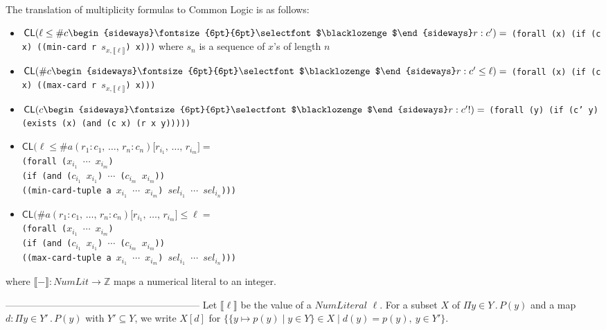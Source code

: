 \documentclass[10pt,fleqn,%
\ifpretendfinal
final%
\else
draft%
\fi,
]{scrreprt}
\newcommand*{\CL}{\ensuremath{\mathsf{CL}}\xspace}
\newcommand{\composition}{\raisebox{0.2pt}{\begin{sideways}\fontsize{6pt}{6pt}\selectfont$\blacklozenge$\end{sideways}}}
\newcommand{\ZZ}{\mathbb{Z}}
\newcommand{\sem}[1]{\mathopen\llbracket#1\mathclose\rrbracket}
\begin{document}
The translation of multiplicity formulas to Common Logic is as follows:
\begin{itemize}
  \item $\CL(\ell \leq \mathsf{\#}c\composition r \mathrel{\mathsf{:}} c')=$
\texttt{(forall (x) (if (c x) ((min-card r $s_{x,\sem{\ell}}$) x)))}
where  $s_n$ is a sequence of $x$'s of length $n$
  \item $\CL(\mathsf{\#}c\composition r \mathrel{\mathsf{:}} c' \leq \ell)=$
\texttt{(forall (x) (if (c x) ((max-card r $s_{x,\sem{\ell}}$) x)))}
  \item $\CL(c\composition r \mathrel{\mathsf{:}} c'\mathsf{!})=$
\texttt{(forall (y) (if (c' y) (exists (x) (and (c x) (r x y)))))}
  \item 
\begin{tabbing}
$\CL(\ell \leq \mathsf{\#}a(r_1 \mathrel{\mathsf{:}} c_1\mathsf{,}\, \dots\mathsf{,}\, r_n \mathrel{\mathsf{:}} c_n)\mathopen{\mathsf{[}}r_{i_1}\mathsf{,}\, \dots\mathsf{,}\, r_{i_m}\mathclose{\mathsf{]}}=$\\
\texttt{(forall ($x_{i_1}$ $\cdots$ $x_{i_m}$)}\\
\qquad\texttt{(if }\=\texttt{(and ($c_{i_1}$ $x_{i_1}$) $\cdots$ ($c_{i_m}$ $x_{i_m}$))}\\
\>\texttt{((min-card-tuple a $x_{i_1}$ $\cdots$ $x_{i_m}$) $sel_{i_1}$ $\cdots$ $sel_{i_n}$)))}
\end{tabbing}
  \item
\begin{tabbing}
 $\CL(\mathsf{\#}a(r_1 \mathrel{\mathsf{:}} c_1\mathsf{,}\, \dots\mathsf{,}\, r_n \mathrel{\mathsf{:}} c_n)\mathopen{\mathsf{[}}r_{i_1}\mathsf{,}\, \dots\mathsf{,}\, r_{i_m}\mathclose{\mathsf{]}} \leq \ell=$\\
\texttt{(forall ($x_{i_1}$ $\cdots$ $x_{i_m}$)}\\
\qquad\texttt{(if }\=\texttt{(and ($c_{i_1}$ $x_{i_1}$) $\cdots$ ($c_{i_m}$ $x_{i_m}$))}\\
\>\texttt{((max-card-tuple a $x_{i_1}$ $\cdots$ $x_{i_m}$) $sel_{i_1}$ $\cdots$ $sel_{i_n}$)))}
\end{tabbing}
\end{itemize}
%
where $\sem{-} : \mathit{NumLit} \to \ZZ$ maps a numerical literal
to an integer.

------------------------------------------------------------
Let $\sem{\ell}$ be the value of a $\mathit{NumLiteral}$ $\ell$.  For a
subset $X$ of $\Pi y \in Y \,.\, P(y)$ and a map
$d : \Pi y \in Y' \,.\, P(y)$ with $Y' \subseteq Y$, we write $X[d]$ for
$\{ \{ y \mapsto p(y) \mid y \in Y \} \in X \mid d(y) = p(y),\ y \in Y' \}$.
\end{document}
